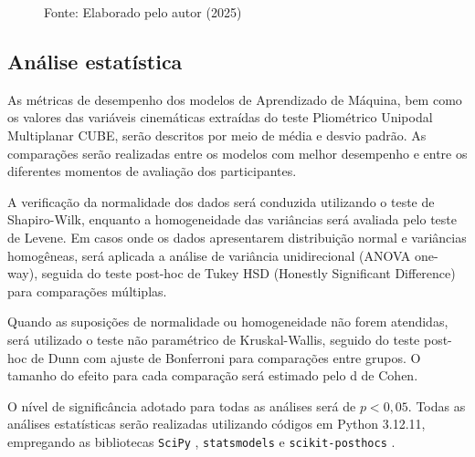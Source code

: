 \documentclass{article}
\begin{document}
\begin{figure}[H]

    \small Fonte: Elaborado pelo autor (2025)

    \label{fig:pipeline_markerless}
\end{figure}





\subsection{Análise estatística}

\noindent As métricas de desempenho dos modelos de Aprendizado de Máquina, bem como os valores das variáveis cinemáticas extraídas do teste Pliométrico Unipodal Multiplanar CUBE, serão descritos por meio de média e desvio padrão. As comparações serão realizadas entre os modelos com melhor desempenho e entre os diferentes momentos de avaliação dos participantes.

A verificação da normalidade dos dados será conduzida utilizando o teste de Shapiro-Wilk, enquanto a homogeneidade das variâncias será avaliada pelo teste de Levene. Em casos onde os dados apresentarem distribuição normal e variâncias homogêneas, será aplicada a análise de variância unidirecional (ANOVA one-way), seguida do teste post-hoc de Tukey HSD (Honestly Significant Difference) para comparações múltiplas.

Quando as suposições de normalidade ou homogeneidade não forem atendidas, será utilizado o teste não paramétrico de Kruskal-Wallis, seguido do teste post-hoc de Dunn com ajuste de Bonferroni para comparações entre grupos. O tamanho do efeito para cada comparação será estimado pelo d de Cohen.

O nível de significância adotado para todas as análises será de $p < 0{,}05$. Todas as análises estatísticas serão realizadas utilizando códigos em Python 3.12.11, empregando as bibliotecas \texttt{SciPy} \cite{2020SciPy-NMeth}, \texttt{statsmodels} \cite{seabold2010statsmodels} e \texttt{scikit-posthocs} \cite{terpilowski2019scikit}.
\end{document}

